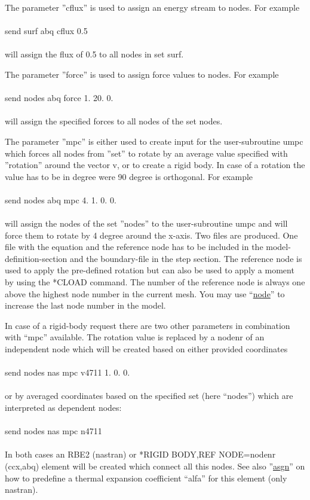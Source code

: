 \documentclass{article}
\providecommand{\htmlref}[2]{\hyperref[#2]{#1}}
\begin{document}
The parameter ''cflux'' is used to assign an energy stream to nodes. For example\\\\send surf abq cflux 0.5\\\\will assign the flux of 0.5 to all nodes in set surf.

The parameter ''force'' is used to assign force values to nodes. For example\\\\send nodes abq force 1. 20. 0.\\\\will assign the specified forces to all nodes of the set nodes.

The parameter ''mpc'' is either used to create input for the user-subroutine umpc which forces all nodes from ''set'' to rotate by an average value specified with ''rotation'' around the vector v, or to create a rigid body. In case of a rotation the value has to be in degree were 90 degree is orthogonal. For example\\\\send nodes abq mpc 4. 1. 0. 0.\\\\will assign the nodes of the set ''nodes'' to the user-subroutine umpc and will force them to rotate by 4 degree around the x-axis. Two files are produced. One file with the equation and the reference node has to be included in the model-definition-section and the boundary-file in the step section. The reference node is used to apply the pre-defined rotation but can also be used to apply a moment by using the *CLOAD command. The number of the reference node is always one above the highest node number in the current mesh. You may use ``\htmlref{node}{node}'' to increase the last node number in the model.

In case of a rigid-body request there are two other parameters in combination with ``mpc'' available. The rotation value is replaced by a nodenr of an independent node which will be created based on either provided coordinates\\\\send nodes nas mpc v4711 1. 0. 0.\\\\or by averaged coordinates based on the specified set (here ``nodes'') which are interpreted as dependent nodes:\\\\send nodes nas mpc n4711\\\\In both cases an RBE2 (nastran) or *RIGID BODY,REF NODE=nodenr (ccx,abq) element will be created which connect all this nodes. See also ''\htmlref{asgn}{asgn}'' on how to predefine a thermal expansion coefficient ``alfa'' for this element (only nastran).\\\\
\end{document}
